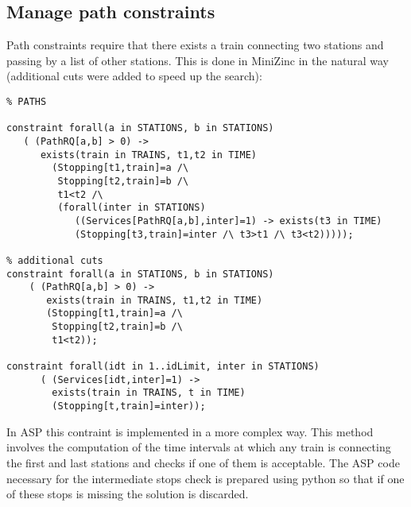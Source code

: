 \documentclass[11pt]{article}
\begin{document}
\subsection{Manage path constraints}

Path constraints require that there exists a train connecting two stations
and passing by a list of other stations. 
This is done in MiniZinc in the natural way (additional cuts were added to 
speed up the search):

\begin{verbatim}
% PATHS

constraint forall(a in STATIONS, b in STATIONS)
   ( (PathRQ[a,b] > 0) -> 
      exists(train in TRAINS, t1,t2 in TIME) 
        (Stopping[t1,train]=a /\ 
         Stopping[t2,train]=b /\ 
         t1<t2 /\
         (forall(inter in STATIONS)
            ((Services[PathRQ[a,b],inter]=1) -> exists(t3 in TIME) 
            (Stopping[t3,train]=inter /\ t3>t1 /\ t3<t2)))));
            
% additional cuts
constraint forall(a in STATIONS, b in STATIONS)
    ( (PathRQ[a,b] > 0) -> 
       exists(train in TRAINS, t1,t2 in TIME) 
       (Stopping[t1,train]=a /\ 
        Stopping[t2,train]=b /\
        t1<t2));

constraint forall(idt in 1..idLimit, inter in STATIONS)
      ( (Services[idt,inter]=1) -> 
        exists(train in TRAINS, t in TIME)
        (Stopping[t,train]=inter));
\end{verbatim}

In ASP this contraint is implemented in a more complex way. This method 
involves the computation of the time intervals at which any train is connecting
the first and last stations and checks if one of them is acceptable. The 
ASP code necessary for the intermediate stops check is prepared using python
so that if one of these stops is missing the solution is discarded.
\end{document}
